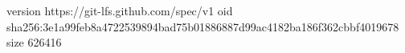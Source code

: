 version https://git-lfs.github.com/spec/v1
oid sha256:3e1a99feb8a4722539894bad75b01886887d99ac4182ba186f362cbbf4019678
size 626416
